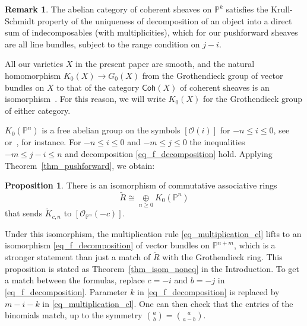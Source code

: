 \documentclass{article}
\def\lra{\longrightarrow}
\newcommand{\Coh}{\mathsf{Coh}}
\newcommand{\mcO}{\mathcal{O}}
\newcommand{\wtR}{\widetilde{R}}
\newcommand{\wtK}{\widetilde{K}}
\newcommand{\PP}{\mathbb{P}}
\newcommand{\oplusop}[1]{{\mathop{\oplus}\limits_{#1}}}
\theoremstyle{definition}
\newtheorem{remark}[thm]{Remark}
\newtheorem{prop}[thm]{Proposition}
\theoremstyle{definition}
\begin{document}
\begin{remark} The abelian category of coherent sheaves on $\PP^k$ satisfies the Krull-Schmidt property of the uniqueness of decomposition of an object into a direct sum of indecomposables (with multiplicities), which for our pushforward sheaves are all line bundles, subject to the range condition on $j-i$.
\end{remark}

All our varieties $X$ in the present paper are smooth, and the
natural homomorphism  $K_0(X)\lra G_0(X)$ from the Grothendieck group of vector bundles on $X$ to that of the category $\Coh(X)$ of coherent sheaves is an isomorphism~\cite{Manin}. For this reason, we will write $K_0(X)$ for the Grothendieck group of either category.

$K_0(\PP^n)$ is a free abelian group on the symbols $[\mcO(i)]$ for $-n\le i \le 0$, see~\cite[Theorem 8.5]{Weibel} or~\cite{Manin}, for instance. For $-n\le i \le 0$ and $-m\le j\le 0$ the inequalities   $-m\le j-i\le n$ and decomposition \eqref{eq_f_decomposition} hold.
Applying Theorem~\ref{thm_pushforward}, we obtain:
\begin{prop}\label{prop_iso_noneq}
    There is an isomorphism of commutative associative rings
    \begin{equation}\label{eq_iso_wtR}
\wtR \cong \oplusop{n\ge 0} K_0(\PP^n)
    \end{equation}
    that sends $\wtK_{c,n}$ to $[\mcO_{\PP^n}(-c)]$.
\end{prop}
Under this isomorphism, the multiplication rule \eqref{eq_multiplication_cl}  lifts to an isomorphism \eqref{eq_f_decomposition} of vector bundles on $\PP^{n+m}$, which is a stronger statement than just a match of $\wtR$ with the Grothendieck ring.
This proposition is stated as Theorem~\ref{thm_isom_noneq} in the Introduction. To get a match between the formulas, replace $c=-i$ and $b=-j$ in \eqref{eq_f_decomposition}. Parameter $k$ in \eqref{eq_f_decomposition} is replaced by $m-i-k$ in
\eqref{eq_multiplication_cl}. One can then check that the entries of the binomials match, up to the symmetry $\binom{a}{b}=\binom{a}{a-b}$.
\end{document}
